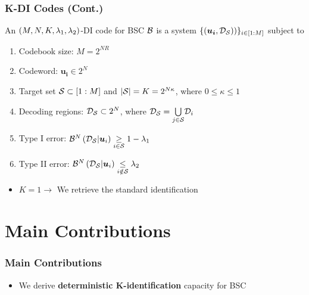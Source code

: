 \documentclass[c]{beamer}
\begin{document}
\begin{frame}[c]
\frametitle{K-DI Codes (Cont.)}

\begin{definition}
	An $\textcolor{black}{(M,N,K,\lambda_1,\lambda_2)}$-DI code for BSC $\B$ is a system $\textcolor{black}{\{(\bm{u_i},\mathcal{D}_\S))\}_{i\in[1:M]}}$ subject to
            \begin{enumerate}
                 \item Codebook size: $M = 2^{NR}$
	             \item Codeword: $\bm{u_i} \in 2^N$
	             \item Target set $\S\subset [1:M]$ and $|\S|=K=2^{N \kappa}$, where $0\leq\kappa\leq 1$
	             \item Decoding regions: $\mathcal{D}_\S \subset 2^N$, where $\mathcal{D}_\S = \underset{j \in \S}{\bigcup} \mathcal{D}_i$
                  \item Type I error: $\B^N \left(\mathcal{D}_\S |\bm{u}_i\right) \underset{i \in \S}{\geq} 1-\lambda_1$
	            \item Type II error: $\B^N \left(\mathcal{D}_\S |\bm{u}_i\right) \underset{i \notin \S}{\leq} \lambda_2$
            \end{enumerate}
\end{definition}
\begin{block}{}
\begin{itemize}
    \item $K=1 \to $ We retrieve the standard identification
\end{itemize}
\end{block}
\end{frame}
\section{Main Contributions}
\begin{frame}[c]
\frametitle{Main Contributions}
\begin{itemize}
\item We derive \textbf{deterministic K-identification} capacity for BSC
\end{itemize}
\end{frame}
\end{document}

